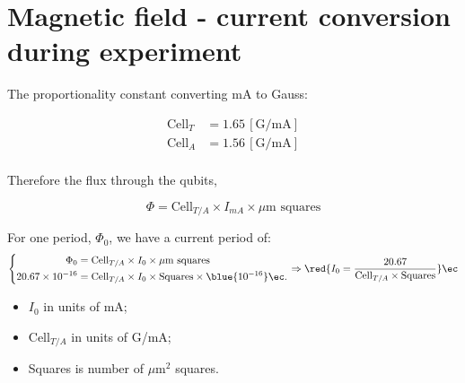 
\section*{Magnetic field - current conversion during experiment}
The proportionality constant converting mA to Gauss:\newline

\begin{equation}
  \label{eq:gauss_coil}
  \begin{aligned}
    \text{Cell}_T & = 1.65\,\left[\text{G/mA} \right]\\
    \text{Cell}_A & = 1.56\,\left[\text{G/mA} \right]\\
  \end{aligned}
\end{equation}

\noindent Therefore  the flux  through the qubits,  \ec

\[
  \Phi = \text{Cell}_{T/A} \times I_{mA} \times \text{$\mu$m squares}
\]

\noindent

\begin{framed}\noindent
  For one period, $ \Phi_0 $, we have a current period of:
  \[
    \left\lbrace\begin{aligned}
        \Phi_0 & = \text{Cell}_{T/A} \times I_0 \times \text{$\mu$m squares}\\
        20.67\times 10^{-16} & = \text{Cell}_{T/A} \times I_0 \times \text{Squares} \times \blue{10^{-16}}\ec.
      \end{aligned}\right. \Rightarrow \red{I_0 = \frac{20.67}{\text{Cell}_{T/A}\times \text{Squares}}}\ec
  \]

  \noindent
  \begin{itemize}
  \item $ I_{0} $ in units of mA;
  \item $\text{Cell}_{T/A}$ in units of G/mA;
  \item Squares is number of $\mu$m$^2$ squares.
  \end{itemize}
\end{framed}

\newpage

